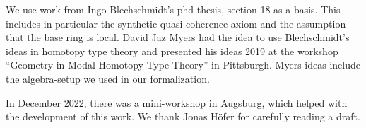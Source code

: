 We use work from Ingo Blechschmidt's phd-thesis, section 18 as a basis.
This includes in particular the synthetic quasi-coherence axiom and the assumption that the base ring is local.
David Jaz Myers had the idea to use Blechschmidt's ideas in homotopy type theory
and presented his ideas 2019 at the workshop ``Geometry in Modal Homotopy Type Theory'' in Pittsburgh.
Myers ideas include the algebra-setup we used in our formalization.

In December 2022, there was a mini-workshop in Augsburg, which helped with the development of this work.
We thank Jonas Höfer for carefully reading a draft.